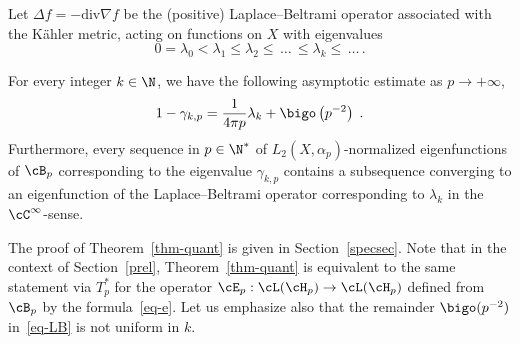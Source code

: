Let $\Delta f= -\text{div} \nabla f$ be the (positive) Laplace--Beltrami operator associated with the K\"ahler metric, acting on functions on $X$ with eigenvalues
\begin{equation}\label{evLB}
0=\lambda_0 < \lambda_1 \leq\lambda_2\leq \,\dots\,\leq\lambda_k\leq\,\dots\,.
\end{equation}

\begin{theo}\label{thm-quant}
For every integer $k\in\N$, we have the following asymptotic estimate as $p\to +\infty$,
\begin{equation}\label{eq-LB}
1-\gamma_{k,p} =\frac{1}{4\pi p}\lambda_k + \bigo\left(p^{-2}\right)\;.
\end{equation}
Furthermore, every sequence in $p\in\N^*$ of $L_2(X,\alpha_p)$-normalized eigenfunctions of $\cB_p$ corresponding to the eigenvalue $\gamma_{k,p}$ contains a subsequence converging to an eigenfunction of the Laplace--Beltrami operator corresponding to $\lambda_k$ in the $\cC^\infty$-sense.
\end{theo}

The proof of Theorem~\ref{thm-quant} is given in Section~\ref{specsec}. Note that in the context of Section~\ref{prel}, Theorem~\ref{thm-quant} is equivalent to the same statement via $T^*_p$ for the operator $\cE_p:\cL(\cH_p)\to\cL(\cH_p)$ defined from $\cB_p$ by the formula~\eqref{eq-e}. Let us emphasize also that the remainder $\bigo(p^{-2})$ in~\eqref{eq-LB} is not uniform in $k$.


